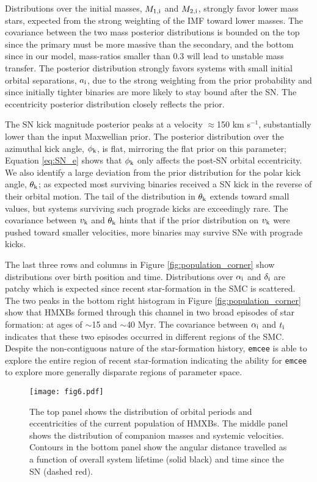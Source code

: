 \documentclass[usenatbib]{mnras}
\begin{document}
Distributions over the initial masses, $M_{\rm 1,i}$ and $M_{\rm 2,i}$, strongly favor lower mass stars, expected from the strong weighting of the IMF toward lower masses. The covariance between the two mass posterior distributions is bounded on the top since the primary must be more massive than the secondary, and the bottom since in our model, mass-ratios smaller than 0.3 will lead to unstable mass transfer. The posterior distribution strongly favors systems with small initial orbital separations, $a_{\rm i}$, due to the strong weighting from the prior probability and since initially tighter binaries are more likely to stay bound after the SN. The eccentricity posterior distribution closely reflects the prior. 

The SN kick magnitude posterior peaks at a velocity $\approx$150 km s$^{-1}$, substantially lower than the input Maxwellian prior. The posterior distribution over the azimuthal kick angle, $\phi_{\rm k}$, is flat, mirroring the flat prior on this parameter; Equation \ref{eq:SN_e} shows that $\phi_{\rm k}$ only affects the post-SN orbital eccentricity. We also identify a large deviation from the prior distribution for the polar kick angle, $\theta_{\rm k}$; as expected most surviving binaries received a SN kick in the reverse of their orbital motion. The tail of the distribution in $\theta_{\rm k}$ extends toward small values, but systems surviving such prograde kicks are exceedingly rare. The covariance between $v_{\rm k}$ and $\theta_{\rm k}$ hints that if the prior distribution on $v_{\rm k}$ were pushed toward smaller velocities, more binaries may survive SNe with prograde kicks. 

The last three rows and columns in Figure \ref{fig:population_corner} show distributions over birth position and time. Distributions over $\alpha_{\rm i}$ and $\delta_{\rm i}$ are patchy which is expected since recent star-formation in the SMC is scattered. The two peaks in the bottom right histogram in Figure \ref{fig:population_corner} show that HMXBs formed through this channel in two broad episodes of star formation: at ages of $\sim$15 and $\sim$40 Myr. The covariance between $\alpha_{\rm i}$ and $t_{\rm i}$ indicates that these two episodes occurred in different regions of the SMC. Despite the non-contiguous nature of the star-formation history, {\tt emcee} is able to explore the entire region of recent star-formation indicating the ability for {\tt emcee} to explore more generally disparate regions of parameter space.  


\begin{figure}
\begin{center}
\texttt{[image: fig6.pdf]}
\caption{ The top panel shows the distribution of orbital periods and eccentricities of the current population of HMXBs. The middle panel shows the distribution of companion masses and systemic velocities. Contours in the bottom panel show the angular distance travelled as a function of  overall system lifetime (solid black) and time since the SN (dashed red). }
\label{fig:smc_population_HMXB}
\end{center}
\end{figure}
\end{document}
